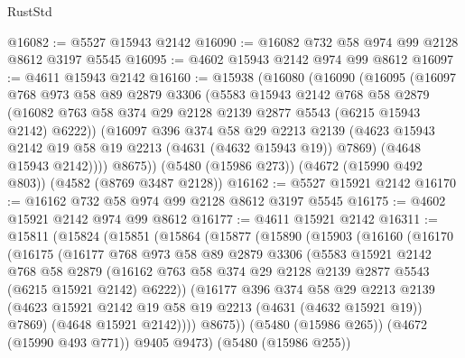 \begin{lexlean}{RustStd}
\begin{coremodule}
{\begin{coremodule}
{{{{{{{{{{{{{{{{@16082 := @5527 @15943 @2142
@16090 := @16082 @732 @58 @974 @99 @2128 @8612 @3197 @5545
@16095 := @4602 @15943 @2142 @974 @99 @8612
@16097 := @4611 @15943 @2142
@16160 := @15938
    (@16080
      (@16090
        (@16095
          (@16097
            @768
            @973
            @58
            @89
            @2879
            @3306
            (@5583
              @15943
              @2142
              @768
              @58
              @2879
              (@16082 @763 @58 @374 @29 @2128 @2139 @2877 @5543 (@6215 @15943 @2142) @6222))
            (@16097
              @396
              @374
              @58
              @29
              @2213
              @2139
              (@4623 @15943 @2142 @19 @58 @19 @2213 (@4631 (@4632 @15943 @19)) @7869)
              (@4648 @15943 @2142))))
        @8675))
    (@5480 (@15986 @273))
    (@4672 (@15990 @492 @803))
    (@4582 (@8769 @3487 @2128))
@16162 := @5527 @15921 @2142
@16170 := @16162 @732 @58 @974 @99 @2128 @8612 @3197 @5545
@16175 := @4602 @15921 @2142 @974 @99 @8612
@16177 := @4611 @15921 @2142
@16311 := @15811
    (@15824
      (@15851
        (@15864
          (@15877
            (@15890
              (@15903
                (@16160
                  (@16170
                    (@16175
                      (@16177
                        @768
                        @973
                        @58
                        @89
                        @2879
                        @3306
                        (@5583
                          @15921
                          @2142
                          @768
                          @58
                          @2879
                          (@16162
                            @763
                            @58
                            @374
                            @29
                            @2128
                            @2139
                            @2877
                            @5543
                            (@6215 @15921 @2142)
                            @6222))
                        (@16177
                          @396
                          @374
                          @58
                          @29
                          @2213
                          @2139
                          (@4623 @15921 @2142 @19 @58 @19 @2213 (@4631 (@4632 @15921 @19)) @7869)
                          (@4648 @15921 @2142))))
                    @8675))
                (@5480 (@15986 @265))
                (@4672 (@15990 @493 @771))
                @9405
                @9473)
              (@5480 (@15986 @255))
}}}}}}}}}}}}}}}}
\end{coremodule}}
\end{coremodule}
\end{lexlean}
